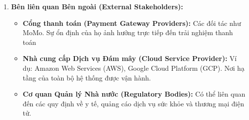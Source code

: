 \begin{enumerate}
\begin{itemize}
        \item \textbf{Đội ngũ Pháp lý \& Tuân thủ (Legal \& Compliance):} Đảm bảo nền tảng tuân thủ các quy định về bảo vệ dữ liệu người dùng (PDPA), giao dịch điện tử và các hợp đồng với Đối tác.
        \item \textbf{Đội ngũ Hỗ trợ khách hàng (Customer Support Team):} Nhân sự trực tiếp xử lý các ticket và yêu cầu từ Người dùng và Đối tác. 
    \end{itemize}
    \item \textbf{Bên liên quan Bên ngoài (External Stakeholders): }
    \begin{itemize}
        \item \textbf{Cổng thanh toán (Payment Gateway Providers):} Các đối tác như MoMo. Sự ổn định của họ ảnh hưởng trực tiếp đến trải nghiệm thanh toán
        \item \textbf{Nhà cung cấp Dịch vụ Đám mây (Cloud Service Provider):} Ví dụ: Amazon Web Services (AWS), Google Cloud Platform (GCP). Nơi hạ tầng của toàn bộ hệ thống được vận hành.
        \item \textbf{Cơ quan Quản lý Nhà nước (Regulatory Bodies):} Có thể liên quan đến các quy định về y tế, quảng cáo dịch vụ sức khỏe và thương mại điện tử.
    \end{itemize}
\end{enumerate}
